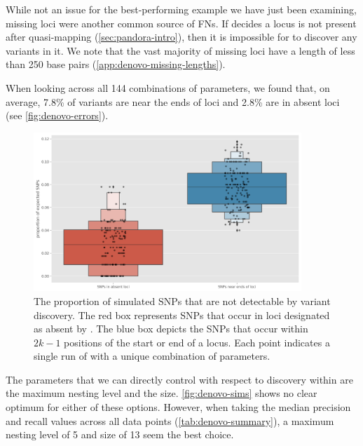 While not an issue for the best-performing example we have just been examining, missing loci were another common source of FNs. If \pandora{} decides a locus is not present after quasi-mapping (\autoref{sec:pandora-intro}), then it is impossible for \denovo{} to discover any variants in it. We note that the vast majority of missing loci have a length of less than 250 base pairs (\autoref{app:denovo-missing-lengths}).

When looking across all 144 combinations of parameters, we found that, on average, 7.8\% of variants are near the ends of loci and 2.8\% are in absent loci (see \autoref{fig:denovo-errors}). 

\begin{figure}
    \centering
    \includegraphics[width=0.9\textwidth]{Chapter1/Figs/denovo_errors.png}
    \caption{The proportion of simulated SNPs that are not detectable by \denovo{} variant discovery. The red box represents SNPs that occur in loci designated as absent by \pandora{}. The blue box depicts the SNPs that occur within $2k-1$ positions of the start or end of a locus. Each point indicates a single run of \pandora{} with a unique combination of parameters.}
    \label{fig:denovo-errors}
\end{figure}

\noindent
The parameters that we can directly control with respect to \denovo{} discovery within \pandora{} are the \prg{} maximum nesting level and the \denovo{} \kmer{} size. \autoref{fig:denovo-sims} shows no clear optimum for either of these options. However, when taking the median precision and recall values across all data points (\autoref{tab:denovo-summary}), a maximum nesting level of 5 and \denovo{} \kmer{} size of 13 seem the best choice.

